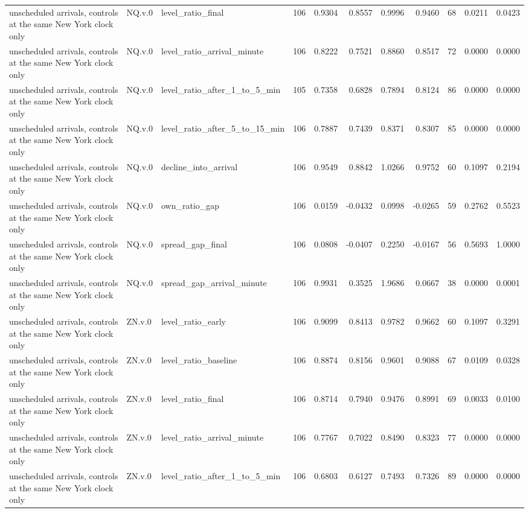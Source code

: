 \begin{tabular}{lllrrrrrrrr}
unscheduled arrivals, controls at the same New York clock only & NQ.v.0 & level_ratio_final & 106 & 0.9304 & 0.8557 & 0.9996 & 0.9460 & 68 & 0.0211 & 0.0423 \\
unscheduled arrivals, controls at the same New York clock only & NQ.v.0 & level_ratio_arrival_minute & 106 & 0.8222 & 0.7521 & 0.8860 & 0.8517 & 72 & 0.0000 & 0.0000 \\
unscheduled arrivals, controls at the same New York clock only & NQ.v.0 & level_ratio_after_1_to_5_min & 105 & 0.7358 & 0.6828 & 0.7894 & 0.8124 & 86 & 0.0000 & 0.0000 \\
unscheduled arrivals, controls at the same New York clock only & NQ.v.0 & level_ratio_after_5_to_15_min & 106 & 0.7887 & 0.7439 & 0.8371 & 0.8307 & 85 & 0.0000 & 0.0000 \\
unscheduled arrivals, controls at the same New York clock only & NQ.v.0 & decline_into_arrival & 106 & 0.9549 & 0.8842 & 1.0266 & 0.9752 & 60 & 0.1097 & 0.2194 \\
unscheduled arrivals, controls at the same New York clock only & NQ.v.0 & own_ratio_gap & 106 & 0.0159 & -0.0432 & 0.0998 & -0.0265 & 59 & 0.2762 & 0.5523 \\
unscheduled arrivals, controls at the same New York clock only & NQ.v.0 & spread_gap_final & 106 & 0.0808 & -0.0407 & 0.2250 & -0.0167 & 56 & 0.5693 & 1.0000 \\
unscheduled arrivals, controls at the same New York clock only & NQ.v.0 & spread_gap_arrival_minute & 106 & 0.9931 & 0.3525 & 1.9686 & 0.0667 & 38 & 0.0000 & 0.0001 \\
unscheduled arrivals, controls at the same New York clock only & ZN.v.0 & level_ratio_early & 106 & 0.9099 & 0.8413 & 0.9782 & 0.9662 & 60 & 0.1097 & 0.3291 \\
unscheduled arrivals, controls at the same New York clock only & ZN.v.0 & level_ratio_baseline & 106 & 0.8874 & 0.8156 & 0.9601 & 0.9088 & 67 & 0.0109 & 0.0328 \\
unscheduled arrivals, controls at the same New York clock only & ZN.v.0 & level_ratio_final & 106 & 0.8714 & 0.7940 & 0.9476 & 0.8991 & 69 & 0.0033 & 0.0100 \\
unscheduled arrivals, controls at the same New York clock only & ZN.v.0 & level_ratio_arrival_minute & 106 & 0.7767 & 0.7022 & 0.8490 & 0.8323 & 77 & 0.0000 & 0.0000 \\
unscheduled arrivals, controls at the same New York clock only & ZN.v.0 & level_ratio_after_1_to_5_min & 106 & 0.6803 & 0.6127 & 0.7493 & 0.7326 & 89 & 0.0000 & 0.0000 \\

\end{tabular}
